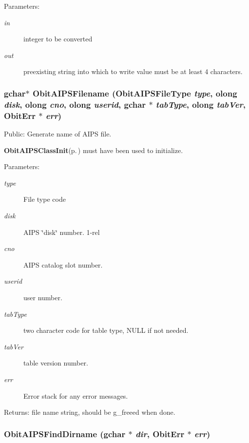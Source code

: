 \begin{Desc}
\item[Parameters:]
\begin{description}
\item[{\em in}]integer to be converted \item[{\em out}]preexisting string into which to write value must be at least 4 characters. \end{description}
\end{Desc}
\subsubsection{\setlength{\rightskip}{0pt plus 5cm}gchar$\ast$ Obit\-AIPSFilename (Obit\-AIPSFile\-Type {\em type}, {\bf olong} {\em disk}, {\bf olong} {\em cno}, {\bf olong} {\em userid}, gchar $\ast$ {\em tab\-Type}, {\bf olong} {\em tab\-Ver}, {\bf Obit\-Err} $\ast$ {\em err})}\label{ObitAIPS_8c_a7}


Public: Generate name of AIPS file. 

{\bf Obit\-AIPSClass\-Init}{\rm (p.\,\pageref{ObitAIPS_8c_a5})} must have been used to initialize. \begin{Desc}
\item[Parameters:]
\begin{description}
\item[{\em type}]File type code \item[{\em disk}]AIPS \char`\"{}disk\char`\"{} number. 1-rel \item[{\em cno}]AIPS catalog slot number. \item[{\em userid}]user number. \item[{\em tab\-Type}]two character code for table type, NULL if not needed. \item[{\em tab\-Ver}]table version number. \item[{\em err}]Error stack for any error messages. \end{description}
\end{Desc}
\begin{Desc}
\item[Returns:]file name string, should be g\_\-freeed when done. \end{Desc}
\subsubsection{ Obit\-AIPSFind\-Dirname (gchar $\ast$ {\em dir}, {\bf Obit\-Err} $\ast$ {\em err})}\label{ObitAIPS_8c_a9}


